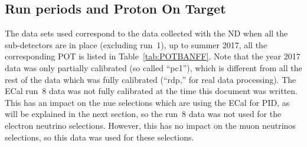 \subsection{Run periods and Proton On Target}
\label{subsec:pot}
The data sets used correspond to the data collected with the \Gls{ND}
when all the sub-detectors are in place (excluding run~1), up to
summer 2017, all the corresponding \Gls{POT} is listed in
Table~\ref{tab:POTBANFF}. Note that the year 2017 data was only
partially calibrated (so called ``\gls{pc1}''), which is different
from all the rest of the data which was fully calibrated
(``\gls{rdp},'' for real data processing). The \Gls{ECal} run~8 data
was not fully calibrated at the time this document was written. This
has an impact on the \Gls{nue} selections which are using the
\Gls{ECal} for \Gls{PID}, as will be explained in the next section, so
the run~8 data was not used for the electron neutrino
selections. However, this has no impact on the muon neutrinos
selections, so this data was used for these selections.

